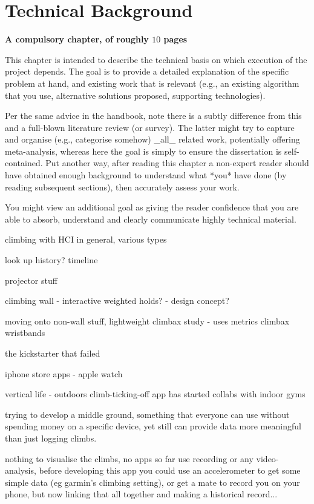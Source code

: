 \chapter{Technical Background}
\label{chap:technical}

{\bf A compulsory chapter,     of roughly $10$ pages}
\vspace{1cm}

\noindent
This chapter is intended to describe the technical basis on which execution
of the project depends.  The goal is to provide a detailed explanation of
the specific problem at hand, and existing work that is relevant (e.g., an
existing algorithm that you use, alternative solutions proposed, supporting
technologies).

Per the same advice in the handbook, note there is a subtly difference from
this and a full-blown literature review (or survey).  The latter might try
to capture and organise (e.g., categorise somehow) _all_ related work,
potentially offering meta-analysis, whereas here the goal is simply to
ensure the dissertation is self-contained.  Put another way, after reading
this chapter a non-expert reader should have obtained enough background to
understand what *you* have done (by reading subsequent sections), then
accurately assess your work.

You might view an additional goal as giving the reader confidence that you are able to absorb, understand and clearly
communicate highly technical material.



climbing with HCI in general, various types

look up history? timeline

projector stuff

climbing wall - interactive weighted holds? - design concept?


moving onto non-wall stuff, lightweight
climbax study - uses metrics
climbax wristbands

the kickstarter that failed

iphone store apps - apple watch

vertical life - outdoors climb-ticking-off app has started collabs with indoor gyms



trying to develop a middle ground, something that everyone can use without spending money on a specific device, yet still can provide data more meaningful than just logging climbs.

nothing to visualise the climbs, no apps so far use recording or any video-analysis, before developing this app you could use an accelerometer to get some simple data (eg garmin's climbing setting), or get a mate to record you on your phone, but now linking that all together and making a historical record...






